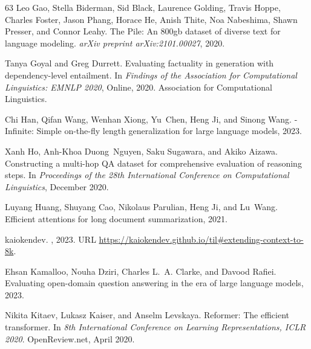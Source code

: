 \documentclass{article} \usepackage{iclr2024_conference,times}
\begin{document}
\begin{thebibliography}{63}
Leo Gao, Stella Biderman, Sid Black, Laurence Golding, Travis Hoppe, Charles
  Foster, Jason Phang, Horace He, Anish Thite, Noa Nabeshima, Shawn Presser,
  and Connor Leahy.
\newblock The {P}ile: An 800gb dataset of diverse text for language modeling.
\newblock \emph{arXiv preprint arXiv:2101.00027}, 2020.

Tanya Goyal and Greg Durrett.
\newblock Evaluating factuality in generation with dependency-level entailment.
\newblock In \emph{Findings of the Association for Computational Linguistics:
  EMNLP 2020}, Online, 2020. Association for Computational Linguistics.

Chi Han, Qifan Wang, Wenhan Xiong, Yu~Chen, Heng Ji, and Sinong Wang.
-{I}nfinite: Simple on-the-fly length generalization for large
  language models, 2023.

Xanh Ho, Anh-Khoa Duong~Nguyen, Saku Sugawara, and Akiko Aizawa.
\newblock Constructing a multi-hop {QA} dataset for comprehensive evaluation of
  reasoning steps.
\newblock In \emph{Proceedings of the 28th International Conference on
  Computational Linguistics}, December 2020.

Luyang Huang, Shuyang Cao, Nikolaus Parulian, Heng Ji, and Lu~Wang.
\newblock Efficient attentions for long document summarization, 2021.

kaiokendev.
, 2023.
\newblock URL \url{https://kaiokendev.github.io/til#extending-context-to-8k}.

Ehsan Kamalloo, Nouha Dziri, Charles L.~A. Clarke, and Davood Rafiei.
\newblock Evaluating open-domain question answering in the era of large
  language models, 2023.

Nikita Kitaev, Lukasz Kaiser, and Anselm Levskaya.
\newblock Reformer: The efficient transformer.
\newblock In \emph{8th International Conference on Learning Representations,
  ICLR 2020}. OpenReview.net, April 2020.


\end{thebibliography}
\end{document}
